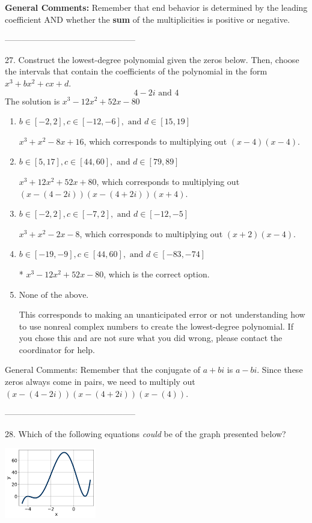 \documentclass{article}[14pt]
\begin{document}
\textbf{General Comments:} Remember that end behavior is determined by the leading coefficient AND whether the \textbf{sum} of the multiplicities is positive or negative.

-----------------------------------------------

27. Construct the lowest-degree polynomial given the zeros below. Then, choose the intervals that contain the coefficients of the polynomial in the form $x^3+bx^2+cx+d$.
$$ 4 - 2i \text{ and } 4 $$ 
The solution is $ x^{3} -12 x^{2} +52 x -80 $ 

\begin{enumerate}[label=\Alph*.] 
\item $ b \in [-2, 2], c \in [-12, -6], \text{ and } d \in [15, 19] $ 

 $x^{3} + x^{2} -8 x + 16$, which corresponds to multiplying out $(x -4)(x -4)$. 
\item $ b \in [5, 17], c \in [44, 60], \text{ and } d \in [79, 89] $ 

 $x^{3} +12 x^{2} +52 x + 80$, which corresponds to multiplying out $(x-(4 - 2i))(x-(4 + 2i))(x + 4)$. 
\item $ b \in [-2, 2], c \in [-7, 2], \text{ and } d \in [-12, -5] $ 

 $x^{3} + x^{2} -2 x -8$, which corresponds to multiplying out $(x + 2)(x -4)$. 
\item $ b \in [-19, -9], c \in [44, 60], \text{ and } d \in [-83, -74] $ 

 * $x^{3} -12 x^{2} +52 x -80$, which is the correct option. 
\item $ \text{None of the above.} $ 

 This corresponds to making an unanticipated error or not understanding how to use nonreal complex numbers to create the lowest-degree polynomial. If you chose this and are not sure what you did wrong, please contact the coordinator for help. 
\end{enumerate} 
 
General Comments: Remember that the conjugate of $a+bi$ is $a-bi$. Since these zeros always come in pairs, we need to multiply out $(x-(4 - 2i))(x-(4 + 2i))(x-(4))$.

-----------------------------------------------

28. Which of the following equations \textit{could} be of the graph presented below?
\begin{center} \includegraphics[width=0.3\textwidth]{../Figures/polyGraphToFunctionA.png} \end{center} 
\end{document}
